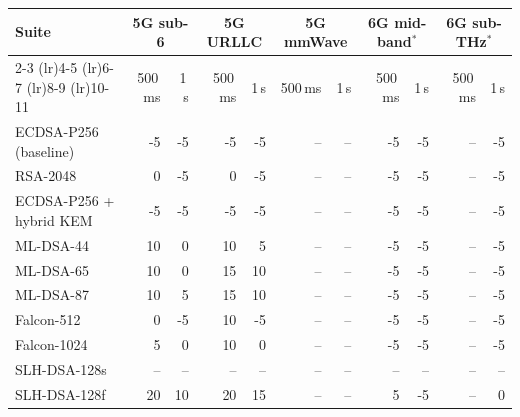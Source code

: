 \begin{tabular}{@{}lrrrrrrrrrr@{}}
\toprule
Suite & \multicolumn{2}{c}{5G sub-6} & \multicolumn{2}{c}{5G URLLC} & \multicolumn{2}{c}{5G mmWave} & \multicolumn{2}{c}{6G mid-band$^\ast$} & \multicolumn{2}{c}{6G sub-THz$^\ast$} \\
\cmidrule(lr){2-3} \cmidrule(lr){4-5} \cmidrule(lr){6-7} \cmidrule(lr){8-9} \cmidrule(lr){10-11}
 & 500\,ms & 1\,s & 500\,ms & 1\,s & 500\,ms & 1\,s & 500\,ms & 1\,s & 500\,ms & 1\,s \\
\midrule
ECDSA-P256 (baseline) & -5 & -5 & -5 & -5 & -- & -- & -5 & -5 & -- & -5 \\
RSA-2048 & 0 & -5 & 0 & -5 & -- & -- & -5 & -5 & -- & -5 \\
ECDSA-P256 + hybrid KEM & -5 & -5 & -5 & -5 & -- & -- & -5 & -5 & -- & -5 \\
ML-DSA-44 & 10 & 0 & 10 & 5 & -- & -- & -5 & -5 & -- & -5 \\
ML-DSA-65 & 10 & 0 & 15 & 10 & -- & -- & -5 & -5 & -- & -5 \\
ML-DSA-87 & 10 & 5 & 15 & 10 & -- & -- & -5 & -5 & -- & -5 \\
Falcon-512 & 0 & -5 & 10 & -5 & -- & -- & -5 & -5 & -- & -5 \\
Falcon-1024 & 5 & 0 & 10 & 0 & -- & -- & -5 & -5 & -- & -5 \\
SLH-DSA-128s & -- & -- & -- & -- & -- & -- & -- & -- & -- & -- \\
SLH-DSA-128f & 20 & 10 & 20 & 15 & -- & -- & 5 & -5 & -- & 0 \\
\bottomrule
\end{tabular}
